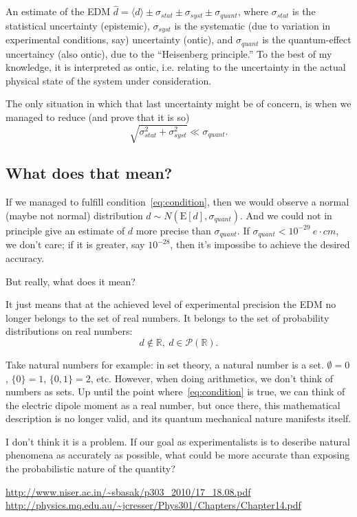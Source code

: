 \documentclass[a4paper,14pt]{article}
\newcommand{\avg}[1]{\langle {#1} \rangle}
\newcommand{\xp}[1]{\mathrm{E}\left[{#1}\right]}
\begin{document}
An estimate of the EDM $\hat d = \avg{d} \pm \sigma_{stat} \pm \sigma_{syst} \pm \sigma_{quant}$,
where $\sigma_{stat}$ is the statistical uncertainty (epistemic), $\sigma_{syst}$ is the systematic
(due to variation in experimental conditions, say) uncertainty (ontic), and $\sigma_{quant}$ is the
quantum-effect uncertaincy (also ontic), due to the ``Heisenberg principle.'' To the best of my knowledge,
it is interpreted as ontic, i.e. relating to the uncertainty in the actual physical state of the system
under consideration.

The only situation in which that last uncertainty might be of concern, is when we managed to reduce
(and prove that it is so)
\begin{equation}\label{eq:condition}
  \sqrt{\sigma_{stat}^2 + \sigma_{syst}^2}\ll \sigma_{quant}.
\end{equation}

\subsection{What does that mean?}
If we managed to fulfill condition~\eqref{eq:condition}, then we would observe a normal (maybe not normal)
distribution $d\sim N(\xp{d}, \sigma_{quant})$. And we could not in principle give an estimate of $d$ more precise
than $\sigma_{quant}$. If $\sigma_{quant} < 10^{-29} ~e\cdot cm$, we don't care; if it is greater, say $10^{-28}$,
then it's impossibe to achieve the desired accuracy.

But really, what does it mean?

It just means that at the achieved level of experimental precision the EDM no longer belongs to the set of real
numbers. It belongs to the set of probability distributions on real numbers:
\[
d\notin \mathbb{R},~ d\in\mathcal P(\mathbb{R}).
\]

Take natural numbers for example: in set theory, a natural number is a set.
$\emptyset = 0$, $\{0\} = 1$, $\{0, 1\} = 2$, etc. However, when doing arithmetics, we don't think of numbers
as sets. Up until the point where~\eqref{eq:condition} is true, we can think of the electric dipole moment as
a real number, but once there, this mathematical description is no longer valid, and its quantum mechanical
nature manifests itself.

I don't think it is a problem. If our goal as experimentalists is to describe natural phenomena as accurately
as possible, what could be more accurate than exposing the probabilistic nature of the quantity?

\begin{thebibliography}{9}
  \url{http://www.niser.ac.in/~sbasak/p303_2010/17_18.08.pdf}
  \url{http://physics.mq.edu.au/~jcresser/Phys301/Chapters/Chapter14.pdf}
\end{thebibliography}
\end{document}
